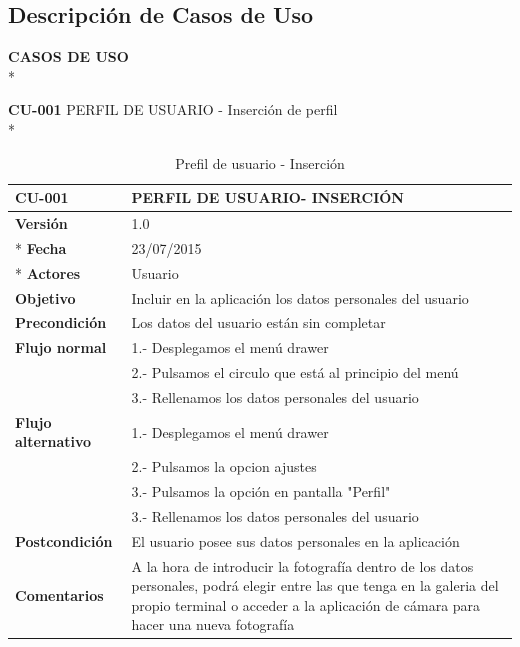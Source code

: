 \documentclass[../pfc.tex]{subfiles}
\begin{document}
	\subsection{Descripción de Casos de Uso}
	
	\textbf{CASOS DE USO}\\*
	
		
	\textbf{CU-001} PERFIL DE USUARIO - Inserción de perfil\\*
	
	\begin{table}[H]
		\centering
		\begin{tabular}[t]{|p{3cm}|p{9.5cm}|}
				\hline \textbf{CU-001} & \textbf{PERFIL DE USUARIO- INSERCIÓN} \\*
				\hline\hline \textbf{Versión} & 1.0 \\ *
				\hline\hline \textbf{Fecha} & 23/07/2015 \\ *
				\hline\textbf{Actores} 	& Usuario\\*
				\hline \textbf{Objetivo} & Incluir en la aplicación los datos personales del usuario\\* 			
				\hline \textbf{Precondición} & Los datos del usuario están sin completar \\* 
				\hline \textbf{Flujo normal} & 1.- Desplegamos el menú drawer \\* 
											 & 2.- Pulsamos el circulo que está al principio del menú \\*	
											 & 3.- Rellenamos los datos personales del usuario\\*	
				\hline \textbf{Flujo alternativo} & 1.- Desplegamos el menú drawer \\* 
 												  & 2.- Pulsamos la opcion ajustes \\*	
												  & 3.- Pulsamos la opción en pantalla "Perfil" \\*	
												  & 3.- Rellenamos los datos personales del usuario \\*	
				\hline \textbf{Postcondición} & El usuario posee sus datos personales en la aplicación \\* 
				\hline \textbf{Comentarios}   & A la hora de introducir la fotografía dentro de los datos personales, podrá elegir entre las que tenga en la galeria del propio terminal o acceder a la aplicación de cámara para hacer una nueva fotografía\\*
				\hline
			\end{tabular}
			\caption{Prefil de usuario - Inserción}
			\label{tabla:caso001}
	\end{table}
	
\end{document}
